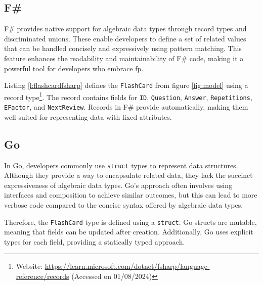         \subsection*{F\#}
        F\# provides native support for algebraic data types through record types and discriminated unions. These enable developers to define a set of related values that can be handled concisely and expressively using pattern matching. This feature enhances the readability and maintainability of F\# code, making it a powerful tool for developers who embrace \ac{fp}.

        Listing \ref{l:flashcardfsharp} defines the \texttt{FlashCard} from figure \ref{fig:model} using a record type\footnote{Website: \url{https://learn.microsoft.com/dotnet/fsharp/language-reference/records} (Accessed on 01/08/2024)}. The record contains fields for \texttt{ID}, \texttt{Question}, \texttt{Answer}, \texttt{Repetitions}, \texttt{EFactor}, and \texttt{NextReview}. Records in F\# provide automatically, making them well-suited for representing data with fixed attributes.

        \subsection*{Go}
        In Go, developers commonly use \texttt{struct} types to represent data structures. Although they provide a way to encapsulate related data, they lack the succinct expressiveness of algebraic data types. Go's approach often involves using interfaces and composition to achieve similar outcomes, but this can lead to more verbose code compared to the concise syntax offered by algebraic data types.

        Therefore, the \texttt{FlashCard} type is defined using a \texttt{struct}. Go structs are mutable, meaning that fields can be updated after creation. Additionally, Go uses explicit types for each field, providing a statically typed approach.

